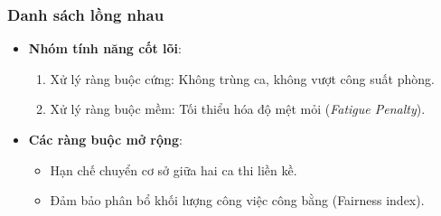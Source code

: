 \subsubsection{Danh sách lồng nhau}
\begin{itemize}
    \item \textbf{Nhóm tính năng cốt lõi}:
    \begin{enumerate}
        \item Xử lý ràng buộc cứng: Không trùng ca, không vượt công suất phòng.
        \item Xử lý ràng buộc mềm: Tối thiểu hóa độ mệt mỏi (\textit{Fatigue Penalty}).
    \end{enumerate}
    \item \textbf{Các ràng buộc mở rộng}:
    \begin{itemize}
        \item Hạn chế chuyển cơ sở giữa hai ca thi liền kề.
        \item Đảm bảo phân bổ khối lượng công việc công bằng (Fairness index).
    \end{itemize}
\end{itemize}

